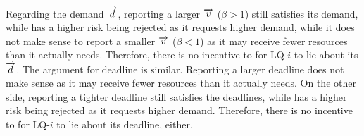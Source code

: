 Regarding the demand $\protect\overrightarrow{d}$, reporting a larger $\protect\overrightarrow{v}$ ($\beta>1$) still satisfies its demand, while has a higher risk being rejected as it requests higher demand, while it does not make sense to report a smaller $\protect\overrightarrow{v}$ ($\beta<1$) as it may receive fewer resources than it actually needs. %
Therefore, there is no incentive to for LQ-$i$ to lie about its $\protect\overrightarrow{d}$.
The argument for deadline is similar. Reporting a larger deadline does not make sense as it may receive fewer resources than it actually needs. On the other side, reporting a tighter deadline still satisfies the deadlines, while has a higher risk being rejected as it requests higher demand. 
Therefore, there is no incentive to for LQ-$i$ to lie about its deadline, either.

%


